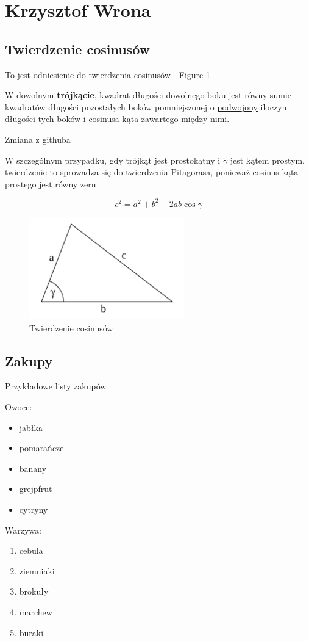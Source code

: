 \section{Krzysztof Wrona}

\subsection{Twierdzenie cosinusów}

To jest odniesienie do twierdzenia cosinusów - Figure \ref{fig:twierdzenie_cosinusow}

W dowolnym \textbf{trójkącie}, kwadrat długości dowolnego boku jest równy sumie kwadratów długości pozostałych boków pomniejszonej o \underline{podwojony} iloczyn długości tych boków i cosinusa kąta zawartego między nimi.

Zmiana z githuba

W szczególnym przypadku, gdy trójkąt jest prostokątny i $\gamma$ jest kątem prostym, twierdzenie to sprowadza się do twierdzenia Pitagorasa, ponieważ cosinus kąta prostego jest równy zeru


\[ c^2 = a^2 + b^2 - 2ab \cos \gamma \]


\begin{figure}[h] 
\centering
\includegraphics[width=0.6\textwidth]{pictures/twierdzenie_cosinusow.png}
\caption{\label{fig:twierdzenie_cosinusow}Twierdzenie cosinusów}
\end{figure}





\subsection{Zakupy}

Przykładowe listy zakupów

Owoce:

\begin{itemize}
\item jabłka
\item pomarańcze
\item banany
\item grejpfrut
\item cytryny
\end{itemize}

Warzywa:

\begin{enumerate}
\item cebula
\item ziemniaki
\item brokuły
\item marchew
\item buraki
\end{enumerate}
